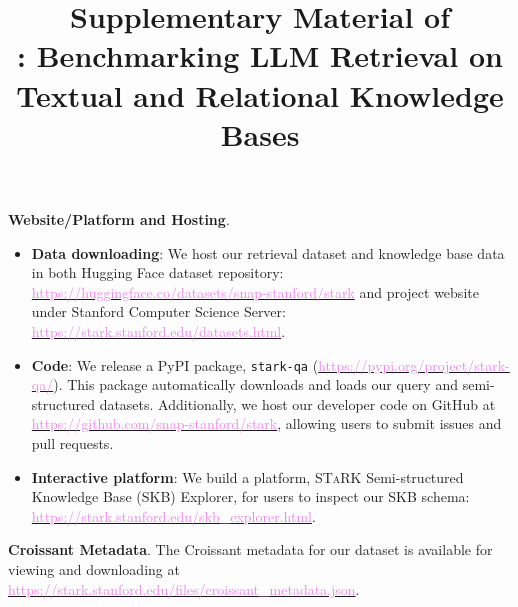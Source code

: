\documentclass{article}
\title{Supplementary Material of \\\benchmarkt: Benchmarking LLM Retrieval on Textual and Relational Knowledge Bases }
\newcommand{\benchmarkh}{\textsc{STaRK }}
\newcommand{\xhdr}[1]{{\vspace{-2pt}\noindent\bfseries #1}.}
\begin{document}
\renewcommand{\thefootnote}{\fnsymbol{footnote}}

\maketitle
\vspace{-10pt}


\xhdr{Website/Platform and Hosting} 
\vspace{-5pt}
\begin{itemize}[leftmargin=*]
    \item \textbf{Data downloading}: We host our retrieval dataset and knowledge base data in both Hugging Face dataset repository: \href{https://huggingface.co/datasets/snap-stanford/stark/tree/main}{\textcolor{Violet}{https://huggingface.co/datasets/snap-stanford/stark}} and project website under Stanford Computer Science Server: \href{https://stark.stanford.edu/datasets.html}{\textcolor{Violet}{https://stark.stanford.edu/datasets.html}}. 
    \item \textbf{Code}: We release a PyPI package, \texttt{stark-qa} (\href{https://pypi.org/project/stark-qa/}{\textcolor{Violet}{https://pypi.org/project/stark-qa/}}). This package automatically downloads and loads our query and semi-structured datasets. Additionally, we host our developer code on GitHub at \href{https://github.com/snap-stanford/stark}{\textcolor{Violet}{https://github.com/snap-stanford/stark}}, allowing users to submit issues and pull requests.
    \item \textbf{Interactive platform}: We build a platform, \benchmarkh Semi-structured Knowledge Base (SKB) Explorer, for users to inspect our SKB schema: \href{https://stark.stanford.edu/skb_explorer.html}{\textcolor{Violet}{https://stark.stanford.edu/skb\_explorer.html}}.
\end{itemize}

\xhdr{Croissant Metadata} The Croissant metadata for our dataset is available for viewing and downloading at \href{https://stark.stanford.edu/files/croissant_metadata.json}{\textcolor{Violet}{https://stark.stanford.edu/files/croissant\_metadata.json}}. 
\end{document}
